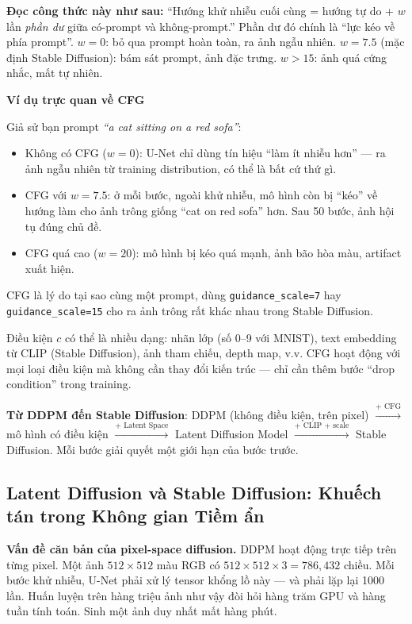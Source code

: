 \textbf{Đọc công thức này như sau:} ``Hướng khử nhiễu cuối cùng = hướng tự do + $w$ lần \textit{phần dư} giữa có-prompt và không-prompt.'' Phần dư đó chính là ``lực kéo về phía prompt''. $w = 0$: bỏ qua prompt hoàn toàn, ra ảnh ngẫu nhiên. $w = 7.5$ (mặc định Stable Diffusion): bám sát prompt, ảnh đặc trưng. $w > 15$: ảnh quá cứng nhắc, mất tự nhiên.

\begin{mdframed}[style=infobox]
\textbf{Ví dụ trực quan về CFG}

Giả sử bạn prompt \textit{``a cat sitting on a red sofa''}:
\begin{itemize}
    \item Không có CFG ($w=0$): U-Net chỉ dùng tín hiệu ``làm ít nhiễu hơn'' --- ra ảnh ngẫu nhiên từ training distribution, có thể là bất cứ thứ gì.
    \item CFG với $w=7.5$: ở mỗi bước, ngoài khử nhiễu, mô hình còn bị ``kéo'' về hướng làm cho ảnh trông giống ``cat on red sofa'' hơn. Sau 50 bước, ảnh hội tụ đúng chủ đề.
    \item CFG quá cao ($w=20$): mô hình bị kéo quá mạnh, ảnh bão hòa màu, artifact xuất hiện.
\end{itemize}

CFG là lý do tại sao cùng một prompt, dùng \texttt{guidance\_scale=7} hay \texttt{guidance\_scale=15} cho ra ảnh trông rất khác nhau trong Stable Diffusion.
\end{mdframed}

Điều kiện $c$ có thể là nhiều dạng: nhãn lớp (số 0--9 với MNIST), text embedding từ CLIP (Stable Diffusion), ảnh tham chiếu, depth map, v.v. CFG hoạt động với mọi loại điều kiện mà không cần thay đổi kiến trúc --- chỉ cần thêm bước ``drop condition'' trong training.

\textbf{Từ DDPM đến Stable Diffusion}: DDPM (không điều kiện, trên pixel) $\xrightarrow{\text{+ CFG}}$ mô hình có điều kiện $\xrightarrow{\text{+ Latent Space}}$ Latent Diffusion Model $\xrightarrow{\text{+ CLIP + scale}}$ Stable Diffusion. Mỗi bước giải quyết một giới hạn của bước trước.

\subsection{Latent Diffusion và Stable Diffusion: Khuếch tán trong Không gian Tiềm ẩn}
\label{subsec:latent_diffusion}

\textbf{Vấn đề căn bản của pixel-space diffusion.}
DDPM hoạt động trực tiếp trên từng pixel. Một ảnh $512 \times 512$ màu RGB có $512 \times 512 \times 3 = 786{,}432$ chiều. Mỗi bước khử nhiễu, U-Net phải xử lý tensor khổng lồ này --- và phải lặp lại 1000 lần. Huấn luyện trên hàng triệu ảnh như vậy đòi hỏi hàng trăm GPU và hàng tuần tính toán. Sinh một ảnh duy nhất mất hàng phút.

